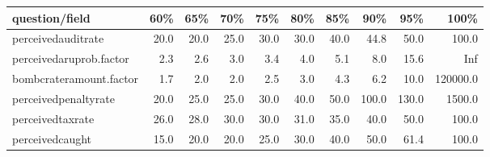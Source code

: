 \begin{table}[ht]
\centering
\begin{tabular}{lrrrrrrrrr}
  \hline
question/field & 60\% & 65\% & 70\% & 75\% & 80\% & 85\% & 90\% & 95\% & 100\% \\ 
  \hline
perceivedauditrate & 20.0 & 20.0 & 25.0 & 30.0 & 30.0 & 40.0 & 44.8 & 50.0 & 100.0 \\ 
  perceivedaruprob.factor & 2.3 & 2.6 & 3.0 & 3.4 & 4.0 & 5.1 & 8.0 & 15.6 & Inf \\ 
  bombcrateramount.factor & 1.7 & 2.0 & 2.0 & 2.5 & 3.0 & 4.3 & 6.2 & 10.0 & 120000.0 \\ 
  perceivedpenaltyrate & 20.0 & 25.0 & 25.0 & 30.0 & 40.0 & 50.0 & 100.0 & 130.0 & 1500.0 \\ 
  perceivedtaxrate & 26.0 & 28.0 & 30.0 & 30.0 & 31.0 & 35.0 & 40.0 & 50.0 & 100.0 \\ 
  perceivedcaught & 15.0 & 20.0 & 20.0 & 25.0 & 30.0 & 40.0 & 50.0 & 61.4 & 100.0 \\ 
   \hline
\end{tabular}
\end{table}
